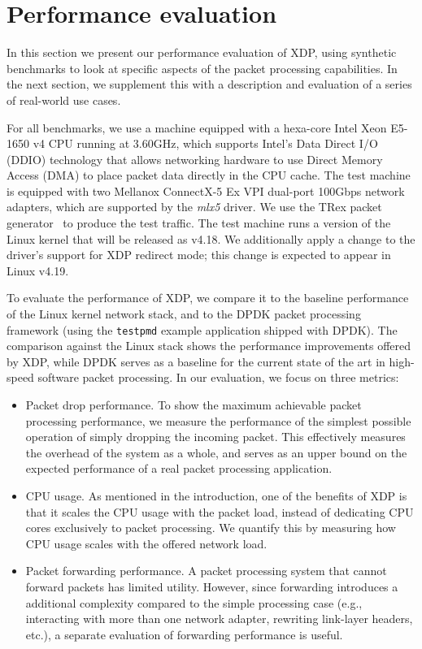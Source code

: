 \documentclass[10pt,sigconf,anonymous]{acmart}
\begin{document}
\section{Performance evaluation}
\label{sec:perf-eval}
In this section we present our performance evaluation of XDP, using synthetic
benchmarks to look at specific aspects of the packet processing capabilities. In
the next section, we supplement this with a description and evaluation of a
series of real-world use cases.

For all benchmarks, we use a machine equipped with a hexa-core Intel Xeon
E5-1650 v4 CPU running at 3.60GHz, which supports Intel's Data Direct I/O (DDIO)
technology that allows networking hardware to use Direct Memory Access (DMA) to
place packet data directly in the CPU cache. The test machine is equipped with
two Mellanox ConnectX-5 Ex VPI dual-port 100Gbps network adapters, which are
supported by the \emph{mlx5} driver. We use the TRex packet
generator~\cite{cisco18:_trex_traff_gener} to produce the test traffic. The test
machine runs a version of the Linux kernel that will be released as v4.18. We
additionally apply a change to the driver's support for XDP redirect mode; this
change is expected to appear in Linux v4.19.


To evaluate the performance of XDP, we compare it to the baseline performance of
the Linux kernel network stack, and to the DPDK packet processing framework
(using the \texttt{testpmd} example application shipped with DPDK). The
comparison against the Linux stack shows the performance improvements offered by
XDP, while DPDK serves as a baseline for the current state of the art in
high-speed software packet processing. In our evaluation, we focus on three
metrics:

\begin{itemize}
\item Packet drop performance. To show the maximum achievable packet processing
  performance, we measure the performance of the simplest possible operation of
  simply dropping the incoming packet. This effectively measures the overhead of
  the system as a whole, and serves as an upper bound on the expected
  performance of a real packet processing application.

\item CPU usage. As mentioned in the introduction, one of the benefits of XDP is
  that it scales the CPU usage with the packet load, instead of dedicating CPU
  cores exclusively to packet processing. We quantify this by measuring how CPU
  usage scales with the offered network load.

\item Packet forwarding performance. A packet processing system that cannot
  forward packets has limited utility. However, since forwarding introduces a
  additional complexity compared to the simple processing case (e.g.,
  interacting with more than one network adapter, rewriting link-layer headers,
  etc.), a separate evaluation of forwarding performance is useful.
\end{itemize}
\end{document}
